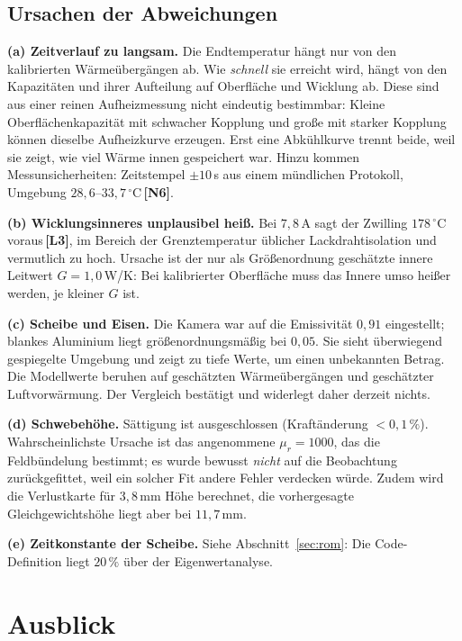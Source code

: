 \documentclass[a4paper, 10pt, conference]{ieeeconf}
\theoremstyle{remark}
\newcommand{\src}[1]{\,\textbf{[#1]}}
\begin{document}
\subsection{Ursachen der Abweichungen}
\label{sec:causes}

\textbf{(a) Zeitverlauf zu langsam.} Die Endtemperatur hängt nur von den
kalibrierten Wärmeübergängen ab. Wie \emph{schnell} sie erreicht wird,
hängt von den Kapazitäten und ihrer Aufteilung auf Oberfläche und
Wicklung ab. Diese sind aus einer reinen Aufheizmessung nicht eindeutig
bestimmbar: Kleine Oberflächenkapazität mit schwacher Kopplung und große mit
starker Kopplung können dieselbe Aufheizkurve erzeugen. Erst eine
Abkühlkurve trennt beide, weil sie zeigt, wie viel Wärme innen gespeichert
war. Hinzu kommen Messunsicherheiten: Zeitstempel $\pm10\,$s aus einem
mündlichen Protokoll, Umgebung $28{,}6$--$33{,}7\,^\circ$C\src{N6}.

\textbf{(b) Wicklungsinneres unplausibel heiß.} Bei $7{,}8\,$A sagt der
Zwilling $178\,^\circ$C voraus\src{L3}, im Bereich der Grenztemperatur
üblicher Lackdrahtisolation und vermutlich zu hoch. Ursache ist der nur als
Größenordnung geschätzte innere Leitwert $G=1{,}0\,$W/K: Bei kalibrierter
Oberfläche muss das Innere umso heißer werden, je kleiner $G$ ist.

\textbf{(c) Scheibe und Eisen.} Die Kamera war auf die Emissivität $0{,}91$
eingestellt; blankes Aluminium liegt größenordnungsmäßig bei $0{,}05$. Sie
sieht überwiegend gespiegelte Umgebung und zeigt zu tiefe Werte, um einen
unbekannten Betrag. Die Modellwerte beruhen auf geschätzten Wärmeübergängen
und geschätzter Luftvorwärmung. Der Vergleich bestätigt und widerlegt daher
derzeit nichts.

\textbf{(d) Schwebehöhe.} Sättigung ist ausgeschlossen (Kraftänderung
$<0{,}1\,\%$). Wahrscheinlichste Ursache ist das angenommene $\mu_r=1000$,
das die Feldbündelung bestimmt; es wurde bewusst \emph{nicht} auf die
Beobachtung zurückgefittet, weil ein solcher Fit andere Fehler verdecken
würde. Zudem wird die Verlustkarte für $3{,}8\,$mm Höhe berechnet, die
vorhergesagte Gleichgewichtshöhe liegt aber bei $11{,}7\,$mm.

\textbf{(e) Zeitkonstante der Scheibe.} Siehe Abschnitt~\ref{sec:rom}: Die
Code-Definition liegt $20\,\%$ über der Eigenwertanalyse.

\section{Ausblick}
\label{sec:outlook}
\end{document}
